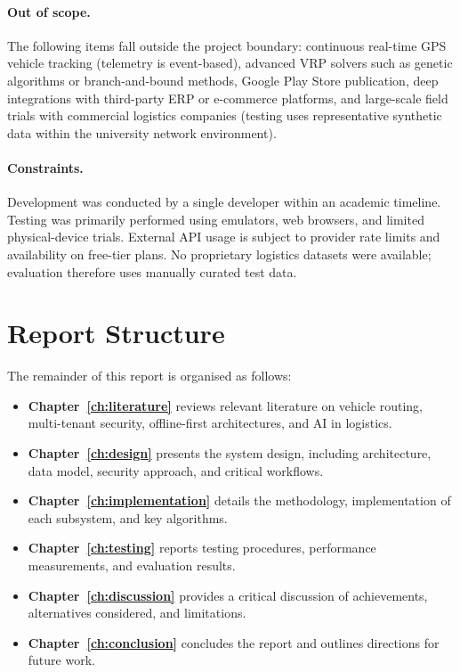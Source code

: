 \paragraph{Out of scope.}
The following items fall outside the project boundary: continuous real-time GPS vehicle tracking (telemetry is event-based), advanced VRP solvers such as genetic algorithms or branch-and-bound methods, Google Play Store publication, deep integrations with third-party ERP or e-commerce platforms, and large-scale field trials with commercial logistics companies (testing uses representative synthetic data within the university network environment).

\paragraph{Constraints.}
Development was conducted by a single developer within an academic timeline. Testing was primarily performed using emulators, web browsers, and limited physical-device trials. External API usage is subject to provider rate limits and availability on free-tier plans. No proprietary logistics datasets were available; evaluation therefore uses manually curated test data.

\section{Report Structure}
\label{sec:report-structure}

The remainder of this report is organised as follows:
\begin{itemize}
  \item \textbf{Chapter~\ref{ch:literature}} reviews relevant literature on vehicle routing, multi-tenant security, offline-first architectures, and AI in logistics.
  \item \textbf{Chapter~\ref{ch:design}} presents the system design, including architecture, data model, security approach, and critical workflows.
  \item \textbf{Chapter~\ref{ch:implementation}} details the methodology, implementation of each subsystem, and key algorithms.
  \item \textbf{Chapter~\ref{ch:testing}} reports testing procedures, performance measurements, and evaluation results.
  \item \textbf{Chapter~\ref{ch:discussion}} provides a critical discussion of achievements, alternatives considered, and limitations.
  \item \textbf{Chapter~\ref{ch:conclusion}} concludes the report and outlines directions for future work.
\end{itemize}
